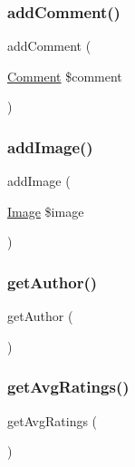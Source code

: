 \subsubsection{\texorpdfstring{addComment()}{addComment()}}
{\footnotesize\ttfamily add\+Comment (\begin{DoxyParamCaption}\item[{\mbox{\hyperlink{class_app_1_1_entity_1_1_comment}{Comment}}}]{\$comment }\end{DoxyParamCaption})}

\mbox{\label{class_app_1_1_entity_1_1_ad_a25c5a91cf132b95f255c8e1bd537604c}} 
\subsubsection{\texorpdfstring{addImage()}{addImage()}}
{\footnotesize\ttfamily add\+Image (\begin{DoxyParamCaption}\item[{\mbox{\hyperlink{class_app_1_1_entity_1_1_image}{Image}}}]{\$image }\end{DoxyParamCaption})}

\mbox{\label{class_app_1_1_entity_1_1_ad_a5286e30390ae3e1b274940286493dd24}} 
\subsubsection{\texorpdfstring{getAuthor()}{getAuthor()}}
{\footnotesize\ttfamily get\+Author (\begin{DoxyParamCaption}{ }\end{DoxyParamCaption})}

\mbox{\label{class_app_1_1_entity_1_1_ad_ae637255703d5beebe63af566c3e7d15e}} 
\subsubsection{\texorpdfstring{getAvgRatings()}{getAvgRatings()}}
{\footnotesize\ttfamily get\+Avg\+Ratings (\begin{DoxyParamCaption}{ }\end{DoxyParamCaption})}

